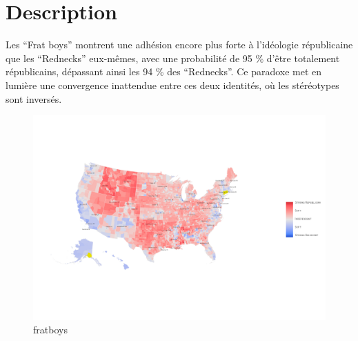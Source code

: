 \documentclass[
  letterpaper,
  DIV=11,
  numbers=noendperiod]{scrartcl}
\begin{document}
\setcounter{page}{1}

\section{Description}\label{description}

Les ``Frat boys'' montrent une adhésion encore plus forte à l'idéologie
républicaine que les ``Rednecks'' eux-mêmes, avec une probabilité de 95
\% d'être totalement républicains, dépassant ainsi les 94 \% des
``Rednecks''. Ce paradoxe met en lumière une convergence inattendue
entre ces deux identités, où les stéréotypes sont inversés.

\begin{figure}[H]

{\centering \includegraphics{img/graph_vote.png}

}

\caption{fratboys}

\end{figure}%
\end{document}
